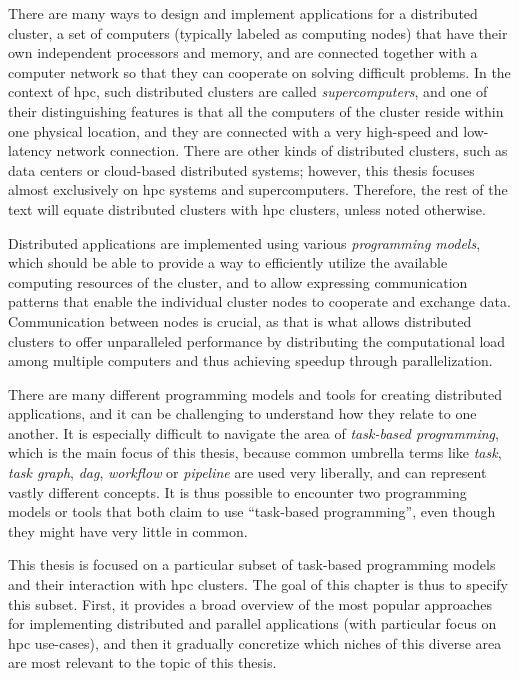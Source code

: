 There are many ways to design and implement applications for a distributed cluster, a set of
computers (typically labeled as computing nodes) that have their own independent processors and
memory, and are connected together with a computer network so that they can cooperate on solving
difficult problems. In the context of \gls{hpc}, such distributed clusters are called
\emph{supercomputers}, and one of their distinguishing features is that all the computers of the
cluster reside within one physical location, and they are connected with a very high-speed and
low-latency network connection. There are other kinds of distributed clusters, such as data centers
or cloud-based distributed systems; however, this thesis focuses almost exclusively on
\gls{hpc} systems and supercomputers. Therefore, the rest of the text will equate
distributed clusters with \gls{hpc} clusters, unless noted otherwise.

Distributed applications are implemented using various \emph{programming models}, which should be able
to provide a way to efficiently utilize the available computing resources of the cluster, and to
allow expressing communication patterns that enable the individual cluster nodes to cooperate and
exchange data. Communication between nodes is crucial, as that is what allows distributed clusters
to offer unparalleled performance by distributing the computational load among multiple computers
and thus achieving speedup through parallelization.

There are many different programming models and tools for creating distributed applications, and it
can be challenging to understand how they relate to one another. It is especially difficult to
navigate the area of \emph{task-based programming}, which is the main focus of this thesis, because common
umbrella terms like \emph{task}, \emph{task graph}, \emph{\gls{dag}},
\emph{workflow} or \emph{pipeline} are used very liberally, and can
represent vastly different concepts. It is thus possible to encounter two programming models or
tools that both claim to use ``task-based programming'', even though they might have very little in
common.

This thesis is focused on a particular subset of task-based programming models and their
interaction with \gls{hpc} clusters. The goal of this chapter is thus to specify this
subset. First, it provides a broad overview of the most popular approaches for implementing
distributed and parallel applications (with particular focus on \gls{hpc} use-cases),
and then it gradually concretize which niches of this diverse area are most relevant to the topic
of this thesis.

